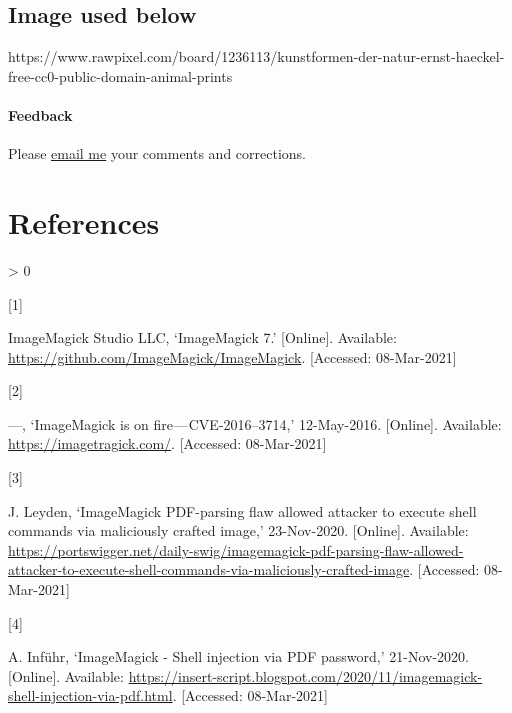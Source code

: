 \documentclass[
  11pt,
  british,
  a4paper,
]{article}
\newlength{\cslhangindent}
\newlength{\csllabelwidth}
\newenvironment{CSLReferences}[2] %
 {%
  \setlength{\parindent}{0pt}
  \ifodd #1 \everypar{\setlength{\hangindent}{\cslhangindent}}\ignorespaces\fi
  \ifnum #2 > 0
  \setlength{\parskip}{#2\baselineskip}
  \fi
 }%
 {}
\newcommand{\CSLLeftMargin}[1]{\parbox[t]{\csllabelwidth}{#1}}
\newcommand{\CSLRightInline}[1]{\parbox[t]{\linewidth - \csllabelwidth}{#1}\break}
\begin{document}
\hypertarget{image-used-below}{%
\subsection{Image used below}\label{image-used-below}}

https://www.rawpixel.com/board/1236113/kunstformen-der-natur-ernst-haeckel-free-cc0-public-domain-animal-prints

\hypertarget{feedback}{%
\paragraph{Feedback}\label{feedback}}

Please \href{mailto:feedback.swanlotus@gmail.com}{email me} your
comments and corrections.

\hypertarget{bibliography}{%
\section*{References}\label{bibliography}}

\hypertarget{refs}{}
\begin{CSLReferences}{0}{0}
\leavevmode\hypertarget{ref-imagemagicksource}{}%
\CSLLeftMargin{{[}1{]} }
\CSLRightInline{ImageMagick Studio LLC, {`ImageMagick 7.'} {[}Online{]}.
Available: \url{https://github.com/ImageMagick/ImageMagick}.
{[}Accessed: 08-Mar-2021{]}}

\leavevmode\hypertarget{ref-imagetragick2016}{}%
\CSLLeftMargin{{[}2{]} }
\CSLRightInline{---, {`ImageMagick is on fire --- CVE-2016--3714,'}
12-May-2016. {[}Online{]}. Available: \url{https://imagetragick.com/}.
{[}Accessed: 08-Mar-2021{]}}

\leavevmode\hypertarget{ref-leyden2020}{}%
\CSLLeftMargin{{[}3{]} }
\CSLRightInline{J. Leyden, {`ImageMagick PDF-parsing flaw allowed
attacker to execute shell commands via maliciously crafted image,'}
23-Nov-2020. {[}Online{]}. Available:
\url{https://portswigger.net/daily-swig/imagemagick-pdf-parsing-flaw-allowed-attacker-to-execute-shell-commands-via-maliciously-crafted-image}.
{[}Accessed: 08-Mar-2021{]}}

\leavevmode\hypertarget{ref-infuhr2020}{}%
\CSLLeftMargin{{[}4{]} }
\CSLRightInline{A. Inführ, {`{ImageMagick - Shell injection via PDF
password},'} 21-Nov-2020. {[}Online{]}. Available:
\url{https://insert-script.blogspot.com/2020/11/imagemagick-shell-injection-via-pdf.html}.
{[}Accessed: 08-Mar-2021{]}}

\end{CSLReferences}
\end{document}

